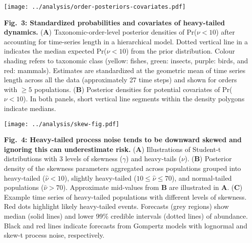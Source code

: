 \clearpage

\begin{center}
\texttt{[image: ../analysis/order-posteriors-covariates.pdf]}
\end{center}

\textbf{Fig.~3: Standardized probabilities and covariates of heavy-tailed
dynamics.} (\textbf{A}) Taxonomic-order-level posterior densities of Pr(\(\nu
< 10\)) after accounting for time-series length in a hierarchical model. Dotted
vertical line in a indicates the median expected Pr(\(\nu < 10\)) from the
prior distribution. Colour shading refers to taxonomic class (yellow: fishes,
green: insects, purple: birds, and red: mammals). Estimates are standardized at
the geometric mean of time series length across all the data (approximately 27
time steps) and shown for orders with \(\ge 5\) populations. (\textbf{B})
Posterior densities for potential covariates of Pr(\(\nu < 10\)). In both
panels, short vertical line segments within the density polygons indicate
medians.

\clearpage

\begin{center}
\texttt{[image: ../analysis/skew-fig.pdf]}
\end{center}

\textbf{Fig.~4: Heavy-tailed process noise tends to be downward skewed and
ignoring this can underestimate risk.} (\textbf{A}) Illustrations of Student-t
distributions with 3 levels of skewness (\(\gamma\)) and heavy-tails (\(\nu\)).
(\textbf{B}) Posterior density of the skewness parameters aggregated across
populations grouped into heavy-tailed (\(\hat{\nu} < 10\)), slightly
heavy-tailed (\(10 \leq \hat{\nu} \leq 70\)), and normal-tailed populations
(\(\hat{\nu} > 70\)). Approximate mid-values from \textbf{B} are illustrated in
\textbf{A}. (\textbf{C}) Example time series of heavy-tailed populations with
different levels of skewness. Red dots highlight likely heavy-tailed events.
Forecasts (grey regions) show median (solid lines) and lower 99\% credible
intervals (dotted lines) of abundance. Black and red lines indicate forecasts
from Gompertz models with lognormal and skew-t process noise, respectively.
